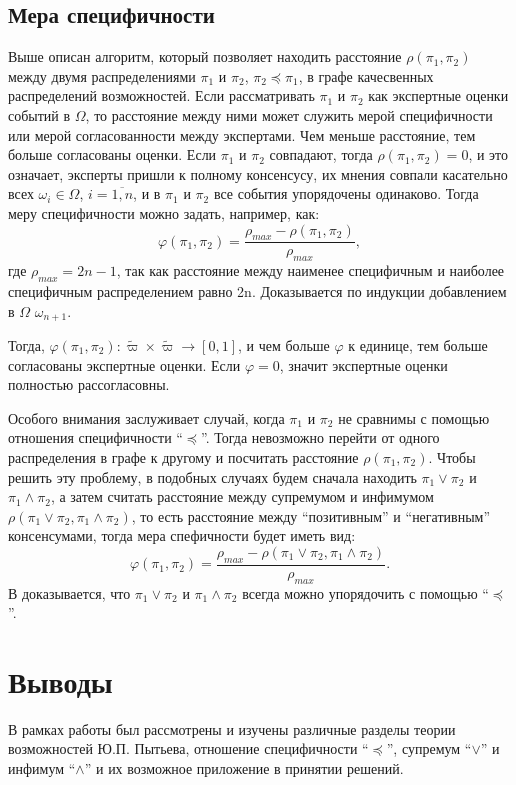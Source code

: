 \documentclass[a4paper, 14pt]{extarticle}
\begin{document}
\subsection{Мера специфичности}
Выше описан алгоритм, который позволяет находить расстояние $\rho(\pi_1, \pi_2)$ между двумя распределениями $\pi_1$ и $\pi_2$, $\pi_2 \preceq \pi_1$, в графе качесвенных распределений возможностей. Если рассматривать $\pi_1$ и $\pi_2$ как экспертные оценки событий в $\Omega$, то расстояние между ними может служить мерой специфичности или мерой согласованности между экспертами. Чем меньше расстояние, тем больше согласованы оценки. Если $\pi_1$ и $\pi_2$ совпадают, тогда $\rho(\pi_1, \pi_2) = 0$, и это означает, эксперты пришли к полному консенсусу, их мнения совпали касательно всех $\omega_i \in \Omega$, $i = \overline{1, n}$, и в $\pi_1$ и $\pi_2$ все события упорядочены одинаково. Тогда меру специфичности можно задать, например, как:
\begin{equation}
    \varphi(\pi_1, \pi_2) = \frac{\rho_{max} - \rho(\pi_1, \pi_2)}{\rho_{max}},
\end{equation}
где $\rho_{max} = 2n - 1$, так как расстояние между наименее специфичным и наиболее специфичным распределением равно 2n. Доказывается по индукции добавлением в $\Omega$ $\omega_{n+1}$.

Тогда, $\varphi(\pi_1, \pi_2): \widetilde{\varpi} \times \widetilde{\varpi} \to [0, 1]$, и чем больше $\varphi$ к единице, тем больше согласованы экспертные оценки. Если $\varphi = 0$, значит экспертные оценки полностью рассогласовны.

Особого внимания заслуживает случай, когда $\pi_1$ и $\pi_2$ не сравнимы с помощью отношения специфичности ``$\preceq$''. Тогда невозможно перейти от одного распределения в графе к другому и посчитать расстояние $\rho(\pi_1, \pi_2)$. Чтобы решить эту проблему, в подобных случаях будем сначала находить $\pi_1 \lor \pi_2$ и $\pi_1 \land \pi_2$, а затем считать расстояние между супремумом и инфимумом $\rho(\pi_1 \lor \pi_2, \pi_1 \land \pi_2)$, то есть расстояние между ``позитивным'' и ``негативным'' консенсумами, тогда мера спефичности будет иметь вид:
\begin{equation}
    \varphi(\pi_1, \pi_2) = \frac{\rho_{max} - \rho(\pi_1 \lor \pi_2, \pi_1 \land \pi_2)}{\rho_{max}}.
\end{equation}
В \cite{ag-op-2021} доказывается, что $\pi_1 \lor \pi_2$ и $\pi_1 \land \pi_2$ всегда можно упорядочить с помощью ``$\preceq$''.
\section*{Выводы}
В рамках работы был рассмотрены и изучены различные разделы теории возможностей Ю.П. Пытьева, отношение специфичности ``$\preceq$'', супремум ``$\lor$'' и инфимум  ``$\land$'' и их возможное приложение в принятии решений.
\end{document}
